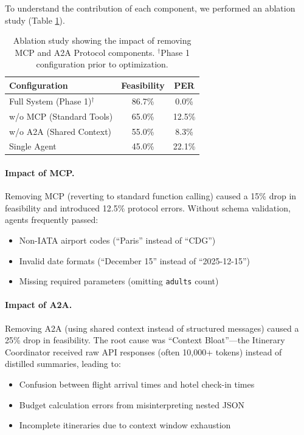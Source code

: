 \documentclass[10pt,twocolumn]{article}
\begin{document}
To understand the contribution of each component, we performed an ablation study (Table \ref{tab:ablation}).

\begin{table}[h]
\centering
\begin{tabular}{lcc}
\toprule
\textbf{Configuration} & \textbf{Feasibility} & \textbf{PER} \\
\midrule
Full System (Phase 1)$^\dagger$ & 86.7\% & 0.0\% \\
w/o MCP (Standard Tools) & 65.0\% & 12.5\% \\
w/o A2A (Shared Context) & 55.0\% & 8.3\% \\
Single Agent & 45.0\% & 22.1\% \\
\bottomrule
\end{tabular}
\caption{Ablation study showing the impact of removing MCP and A2A Protocol components. $^\dagger$Phase 1 configuration prior to optimization.}
\label{tab:ablation}
\end{table}

\paragraph{Impact of MCP.}
Removing MCP (reverting to standard function calling) caused a 15\% drop in feasibility and introduced 12.5\% protocol errors. Without schema validation, agents frequently passed:
\begin{itemize}
    \item Non-IATA airport codes (``Paris'' instead of ``CDG'')
    \item Invalid date formats (``December 15'' instead of ``2025-12-15'')
    \item Missing required parameters (omitting \texttt{adults} count)
\end{itemize}

\paragraph{Impact of A2A.}
Removing A2A (using shared context instead of structured messages) caused a 25\% drop in feasibility. The root cause was ``Context Bloat''---the Itinerary Coordinator received raw API responses (often 10,000+ tokens) instead of distilled summaries, leading to:
\begin{itemize}
    \item Confusion between flight arrival times and hotel check-in times
    \item Budget calculation errors from misinterpreting nested JSON
    \item Incomplete itineraries due to context window exhaustion
\end{itemize}
\end{document}
